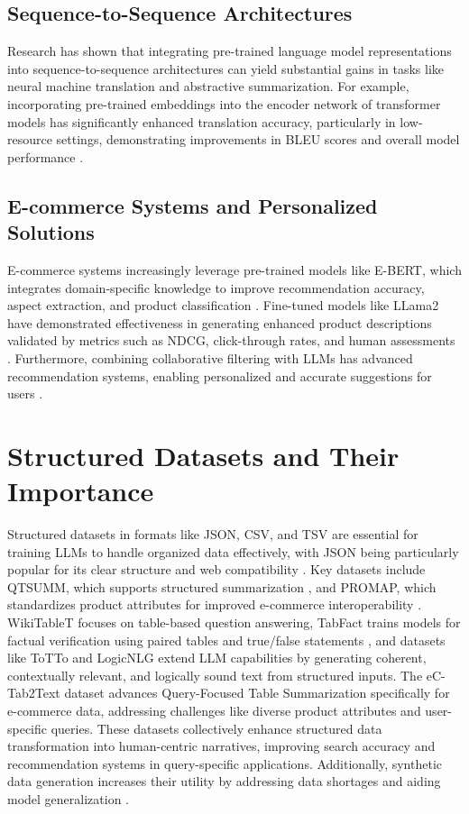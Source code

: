 \subsection{Sequence-to-Sequence Architectures}
Research has shown that integrating pre-trained language model representations into sequence-to-sequence architectures can yield substantial gains in tasks like neural machine translation and abstractive summarization. For example, incorporating pre-trained embeddings into the encoder network of transformer models has significantly enhanced translation accuracy, particularly in low-resource settings, demonstrating improvements in BLEU scores and overall model performance \cite{edunov-etal-2019-pre}.

\subsection{E-commerce Systems and Personalized Solutions}
E-commerce systems increasingly leverage pre-trained models like E-BERT, which integrates domain-specific knowledge to improve recommendation accuracy, aspect extraction, and product classification \cite{zhang2021ebert}. Fine-tuned models like LLama2 have demonstrated effectiveness in generating enhanced product descriptions validated by metrics such as NDCG, click-through rates, and human assessments \cite{zhou2023leveraging}. Furthermore, combining collaborative filtering with LLMs has advanced recommendation systems, enabling personalized and accurate suggestions for users \cite{xu2024emerging}.

\section{Structured Datasets and Their Importance}

Structured datasets in formats like JSON, CSV, and TSV are essential for training LLMs to handle organized data effectively, with JSON being particularly popular for its clear structure and web compatibility \cite{singha2023tabularrepresentationnoisyoperators}. Key datasets include QTSUMM, which supports structured summarization \cite{zhao2023qtsummqueryfocusedsummarizationtabular}, and PROMAP, which standardizes product attributes for improved e-commerce interoperability \cite{macková2023promapdatasetsproductmapping}. WikiTableT focuses on table-based question answering, TabFact trains models for factual verification using paired tables and true/false statements \cite{2019TabFactA}, and datasets like ToTTo \cite{parikh2020tottocontrolledtabletotextgeneration} and LogicNLG \cite{chen2020logicalnaturallanguagegeneration} extend LLM capabilities by generating coherent, contextually relevant, and logically sound text from structured inputs.
The eC-Tab2Text dataset advances Query-Focused Table Summarization specifically for e-commerce data, addressing challenges like diverse product attributes and user-specific queries. These datasets collectively enhance structured data transformation into human-centric narratives, improving search accuracy and recommendation systems in query-specific applications. Additionally, synthetic data generation increases their utility by addressing data shortages and aiding model generalization \cite{suri2023largelanguagemodelsdecision}.

